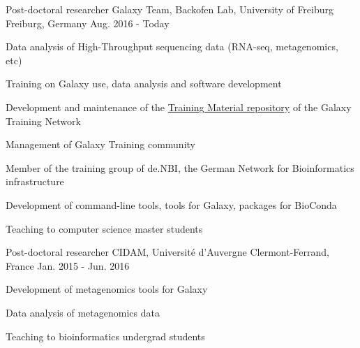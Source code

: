 

\begin{cventries}

  \cventry
    {Post-doctoral researcher} %
    {Galaxy Team, Backofen Lab, University of Freiburg} %
    {Freiburg, Germany} %
    {Aug. 2016 - Today} %
    {
      \begin{cvitems} %
        \item {Data analysis of High-Throughput sequencing data (RNA-seq, metagenomics, etc)}
        \item {Training on Galaxy use, data analysis and software development}
        \item {Development and maintenance of the \href{https://galaxyproject.github.io/training-material/}{Training Material repository} of the Galaxy Training Network}
        \item {Management of Galaxy Training community}
        \item {Member of the training group of de.NBI, the German Network for Bioinformatics infrastructure}
        \item {Development of command-line tools, tools for Galaxy, packages for BioConda}
        \item {Teaching to computer science master students}
      \end{cvitems}
    }

  \cventry
    {Post-doctoral researcher} %
    {CIDAM, Université d'Auvergne} %
    {Clermont-Ferrand, France} %
    {Jan. 2015 - Jun. 2016} %
    {
      \begin{cvitems} %
        \item {Development of metagenomics tools for Galaxy}
        \item {Data analysis of metagenomics data}
        \item {Teaching to bioinformatics undergrad students}
      \end{cvitems}
    }


\end{cventries}
